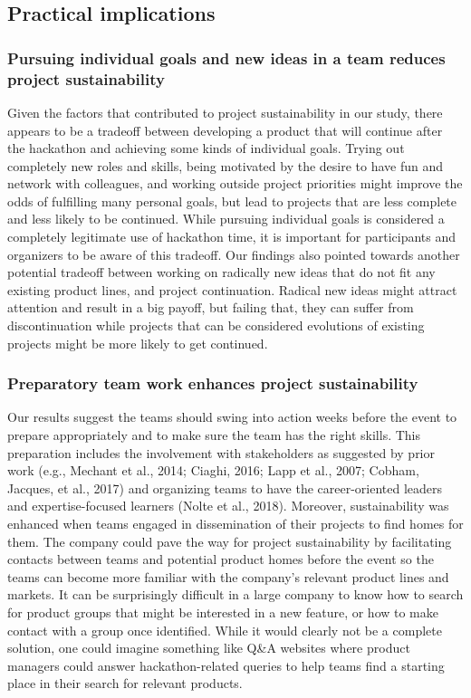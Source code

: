 \documentclass{hcij}
\begin{document}
\subsection{Practical implications}
\subsubsection{Pursuing individual goals and new ideas in a team reduces project sustainability}
Given the factors that contributed to project sustainability in our study, there appears to be a tradeoff between developing a product that will continue after the hackathon and achieving some kinds of individual goals. Trying out completely new roles and skills, being motivated by the desire to have fun and network with colleagues, and working outside project priorities might improve the odds of fulfilling many personal goals, but lead to projects that are less complete and less likely to be continued. While pursuing individual goals is considered a completely legitimate use of hackathon time, it is important for participants and organizers to be aware of this tradeoff. Our findings also pointed towards another potential tradeoff between working on radically new ideas that do not fit any existing product lines, and project continuation. Radical new ideas might attract attention and result in a big payoff, but failing that, they can suffer from discontinuation while projects that can be considered evolutions of existing projects might be more likely to get continued.

\subsubsection{Preparatory team work enhances project sustainability}
Our results suggest the teams should swing into action weeks before the event to prepare appropriately and to make sure the team has the right skills. This preparation includes the involvement with stakeholders as suggested by prior work (e.g., Mechant et al., 2014; Ciaghi, 2016; Lapp et al., 2007; Cobham, Jacques, et al., 2017) and organizing teams to have the career-oriented leaders and expertise-focused learners (Nolte et al., 2018). Moreover, sustainability was enhanced when teams engaged in dissemination of their projects to find homes for them. The company could pave the way for project sustainability by facilitating contacts between teams and potential product homes before the event so the teams can become more familiar with the company’s relevant product lines and markets. It can be surprisingly difficult in a large company to know how to search for product groups that might be interested in a new feature, or how to make contact with a group once identified. While it would clearly not be a complete solution, one could imagine something like Q&A websites where product managers could answer hackathon-related queries to help teams find a starting place in their search for relevant products.
\end{document}
